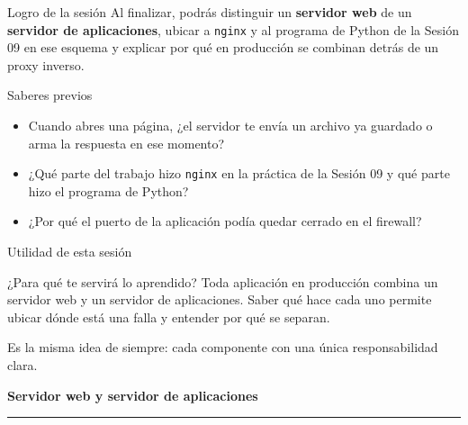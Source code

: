 \documentclass[aspectratio=169,10pt,c]{beamer}
\begin{document}
\begin{frame}[c]
\begin{block}{Logro de la sesión}
Al finalizar, podrás distinguir un \textbf{servidor web} de un \textbf{servidor de aplicaciones}, ubicar a \texttt{nginx} y al programa de Python de la Sesión 09 en ese esquema y explicar por qué en producción se combinan detrás de un proxy inverso.
\end{block}
\end{frame}

\begin{frame}{Saberes previos}
\begin{itemize}\setlength\itemsep{10pt}
  \item Cuando abres una página, ¿el servidor te envía un archivo ya guardado o arma la respuesta en ese momento?
  \item ¿Qué parte del trabajo hizo \texttt{nginx} en la práctica de la Sesión 09 y qué parte hizo el programa de Python?
  \item ¿Por qué el puerto de la aplicación podía quedar cerrado en el firewall?
\end{itemize}
\end{frame}

\begin{frame}{Utilidad de esta sesión}
\begin{block}{¿Para qué te servirá lo aprendido?}
Toda aplicación en producción combina un servidor web y un servidor de aplicaciones. Saber qué hace cada uno permite ubicar dónde está una falla y entender por qué se separan.
\end{block}
\vspace{0.2cm}
\small Es la misma idea de siempre: cada componente con una única responsabilidad clara.
\end{frame}

\begin{frame}[plain]
\vfill
\begin{center}
{\fontsize{29}{34}\selectfont\bfseries Servidor web y servidor de aplicaciones}
\par\vspace{4mm}
{\color{utpRojo}\rule{8.5cm}{1.2pt}}
\end{center}
\vfill
\end{frame}
\end{document}
